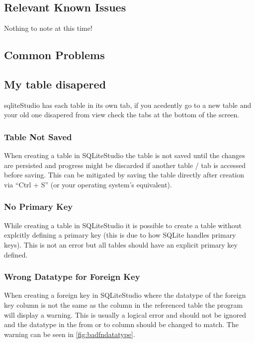 \documentclass[a4paper,11pt,oneside]{article}
\begin{document}
\begin{sloppypar}
\subsection{Relevant Known Issues}
\label{sqliteStudioKnownIssues}
Nothing to note at this time!

\subsection{Common Problems}
\label{sqliteStudioCommonProblems}

\subsection {My table disapered}
\label{sqliteStudioTableDisapered}
sqliteStudio has each table in its own tab, if you acedently go to a new table and your old one disapered from view check the tabs at the bottom of the screen.

\subsubsection{Table Not Saved}
\label{sqliteStudioTableNotSaved}
When creating a table in SQLiteStudio the table is not saved until the changes are persisted and progress might be discarded if another table / tab is accessed before saving. This can be mitigated by saving the table directly after creation via ``Ctrl + S'' (or your operating system's equivalent).

\subsubsection{No Primary Key}
\label{sqliteStudioNoPrimaryKey}
While creating a table in SQLiteStudio it is possible to create a table without explcitly defining a primary key (this is due to how SQLite handles primary keys). This is not an error but all tables should have an explicit primary key defined.


\subsubsection{Wrong Datatype for Foreign Key}
\label{sqliteStudioWrongDatatypeForeignKey}
When creating a foreign key in SQLiteStudio where the datatype of the foreign key column is not the same as the column in the referenced table the program will display a warning. This is usually a logical error and should not be ignored and the datatype in the from or to column should be changed to match. The warning can be seen in \autoref{fig:badfndatatype}.



\end{sloppypar}
\end{document}
